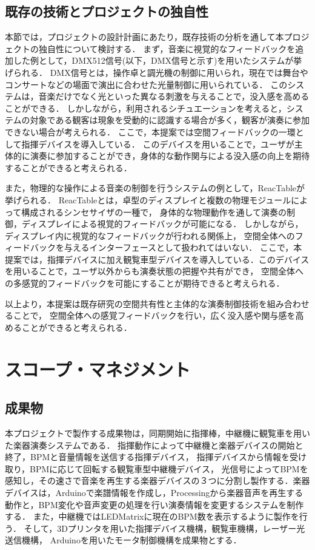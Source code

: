 \documentclass[lualatex,book,paper=a4paper,jafontsize=11.5pt,jafontscale=1.05]{jlreq}
\begin{document}
\subsection{既存の技術とプロジェクトの独自性}
本節では，プロジェクトの設計計画にあたり，既存技術の分析を通して本プロジェクトの独自性について検討する．
まず，音楽に視覚的なフィードバックを追加した例として，DMX512信号(以下，DMX信号と示す)を用いたシステムが挙げられる．
DMX信号とは，操作卓と調光機の制御に用いられ，現在では舞台やコンサートなどの場面で演出に合わせた光量制御に用いられている\cite{sekine2021}．
このシステムは，音楽だけでなく光といった異なる刺激を与えることで，没入感を高めることができる．
しかしながら，利用されるシチュエーションを考えると，システムの対象である観客は現象を受動的に認識する場合が多く，観客が演奏に参加できない場合が考えられる．
ここで，本提案では空間フィードバックの一環として指揮デバイスを導入している．
このデバイスを用いることで，ユーザが主体的に演奏に参加することができ，身体的な動作関与による没入感の向上を期待することができると考えられる．\par
また，物理的な操作による音楽の制御を行うシステムの例として，ReacTableが挙げられる．
ReacTableとは，卓型のディスプレイと複数の物理モジュールによって構成されるシンセサイザの一種で，
身体的な物理動作を通して演奏の制御，ディスプレイによる視覚的フィードバックが可能になる\cite{reactable}．
しかしながら，ディスプレイ内に視覚的なフィードバックが行われる関係上，
空間全体へのフィードバックを与えるインターフェースとして扱われてはいない．
ここで，本提案では，指揮デバイスに加え観覧車型デバイスを導入している．このデバイスを用いることで，ユーザ以外からも演奏状態の把握や共有ができ，
空間全体への多感覚的フィードバックを可能にすることが期待できると考えられる．\par
以上より，本提案は既存研究の空間共有性と主体的な演奏制御技術を組み合わせることで，
空間全体への感覚フィードバックを行い，広く没入感や関与感を高めることができると考えられる．


\section{スコープ・マネジメント}
\subsection{成果物}
本プロジェクトで製作する成果物は，同期開始に指揮棒，中継機に観覧車を用いた楽器演奏システムである．
指揮動作によって中継機と楽器デバイスの開始と終了，BPMと音量情報を送信する指揮デバイス，
指揮デバイスから情報を受け取り，BPMに応じて回転する観覧車型中継機デバイス，
光信号によってBPMを感知し，その速さで音楽を再生する楽器デバイスの３つに分割し製作する．楽器デバイスは，Arduinoで楽譜情報を作成し，Processingから楽器音声を再生する動作と，BPM変化や音声変更の処理を行い演奏情報を変更するシステムを制作する．
また，中継機ではLEDMatrixに現在のBPM数を表示するように製作を行う．
そして，3Dプリンタを用いた指揮デバイス機構，観覧車機構，レーザー光送信機構，
Arduinoを用いたモータ制御機構を成果物とする．
\end{document}
